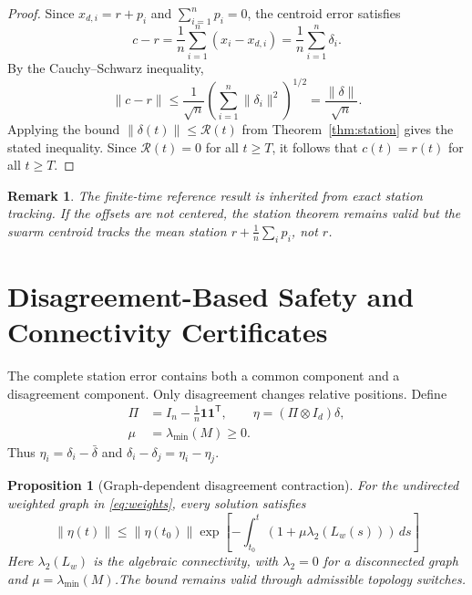 \documentclass[letterpaper,10pt,conference]{ieeeconf}
\newcommand{\norm}[1]{\left\lVert #1 \right\rVert}
\newcommand{\trans}{^{\mathsf T}}
\newtheorem{proposition}{Proposition}
\newtheorem{remark}{Remark}
\begin{document}
\begin{proof}
Since $x_{d,i}=r+p_i$ and $\sum_{i=1}^n p_i=0$, the centroid error satisfies
\[
c-r=\frac{1}{n}\sum_{i=1}^n(x_i-x_{d,i})
=\frac{1}{n}\sum_{i=1}^n\delta_i.
\]
By the Cauchy--Schwarz inequality,
\[
\|c-r\|
\leq \frac{1}{\sqrt n}
\left(\sum_{i=1}^n\|\delta_i\|^2\right)^{1/2}
=\frac{\|\delta\|}{\sqrt n}.
\]
Applying the bound $\|\delta(t)\|\leq\mathcal R(t)$ from Theorem~\ref{thm:station} gives the stated inequality. Since $\mathcal R(t)=0$ for all $t\geq T$, it follows that $c(t)=r(t)$ for all $t\geq T$.
\end{proof}

\begin{remark}
The finite-time reference result is inherited from exact station tracking. If the offsets are not centered, the station theorem remains valid but the swarm centroid tracks the mean station $r+\frac1n\sum_i p_i$, not $r$.
\end{remark}

\section{Disagreement-Based Safety and Connectivity Certificates}
\label{sec:certificates}
The complete station error contains both a common component and a disagreement component. Only disagreement changes relative positions. Define
\begin{equation}
\begin{aligned}
  \Pi&=I_n-\frac1n\mathbf 1\mathbf 1\trans,\qquad
  \eta=(\Pi\otimes I_d)\delta,\\
  \mu&=\lambda_{\min}(M)\geq0.
\end{aligned}
\label{eq:disagreement}
\end{equation}
Thus $\eta_i=\delta_i-\bar\delta$ and $\delta_i-\delta_j=\eta_i-\eta_j$.

\begin{proposition}[Graph-dependent disagreement contraction]
\label{prop:disagreement}
For the undirected weighted graph in \eqref{eq:weights}, every solution satisfies
\begin{equation}
  \norm{\eta(t)}\leq\norm{\eta(t_0)}\exp\left[-\int_{t_0}^{t}
  \left(1+\mu\lambda_2(L_w(s))\right)\,ds\right]
  \label{eq:eta-bound}
\end{equation}
Here $\lambda_2(L_w)$ is the algebraic connectivity, with $\lambda_2=0$ for a disconnected graph and $\mu=\lambda_{\min}(M)$.The bound remains valid through admissible topology switches.
\end{proposition}
\end{document}
